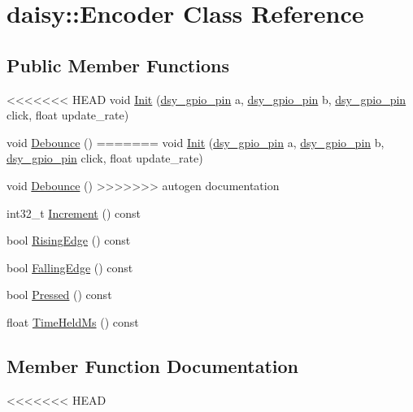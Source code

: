 \hypertarget{classdaisy_1_1_encoder}{}\section{daisy\+:\+:Encoder Class Reference}
\label{classdaisy_1_1_encoder}
\subsection*{Public Member Functions}
\begin{DoxyCompactItemize}
\item 
<<<<<<< HEAD
void \hyperlink{classdaisy_1_1_encoder_ac4c797dfe737427064fb64ceeb28be80}{Init} (\hyperlink{structdsy__gpio__pin}{dsy\+\_\+gpio\+\_\+pin} a, \hyperlink{structdsy__gpio__pin}{dsy\+\_\+gpio\+\_\+pin} b, \hyperlink{structdsy__gpio__pin}{dsy\+\_\+gpio\+\_\+pin} click, float update\+\_\+rate)
\item 
void \hyperlink{classdaisy_1_1_encoder_a5bed96517dbffee1fb16255ec9faa7e7}{Debounce} ()
=======
void \hyperlink{classdaisy_1_1_encoder_aa594d3ec06e1582d85c82d5b7e4972dd}{Init} (\hyperlink{structdsy__gpio__pin}{dsy\+\_\+gpio\+\_\+pin} a, \hyperlink{structdsy__gpio__pin}{dsy\+\_\+gpio\+\_\+pin} b, \hyperlink{structdsy__gpio__pin}{dsy\+\_\+gpio\+\_\+pin} click, float update\+\_\+rate)
\item 
void \hyperlink{classdaisy_1_1_encoder_af07f408ac0225fbf124cce607ca4fb6b}{Debounce} ()
>>>>>>> autogen documentation
\item 
int32\+\_\+t \hyperlink{classdaisy_1_1_encoder_ae0f2d9d22a006a45daa1ac9cbcba4050}{Increment} () const
\item 
bool \hyperlink{classdaisy_1_1_encoder_ab501cf73d10d81058b485c48b9eb506f}{Rising\+Edge} () const
\item 
bool \hyperlink{classdaisy_1_1_encoder_aaf89f3fee67ab4866b08be0616bba978}{Falling\+Edge} () const
\item 
bool \hyperlink{classdaisy_1_1_encoder_a7c3a633c4e578dac0bdf5829b9bed99f}{Pressed} () const
\item 
float \hyperlink{classdaisy_1_1_encoder_a5f2e112fa7ab67140344af05f83172ab}{Time\+Held\+Ms} () const
\end{DoxyCompactItemize}


\subsection{Member Function Documentation}
<<<<<<< HEAD
\mbox{\label{classdaisy_1_1_encoder_a5bed96517dbffee1fb16255ec9faa7e7}} 
